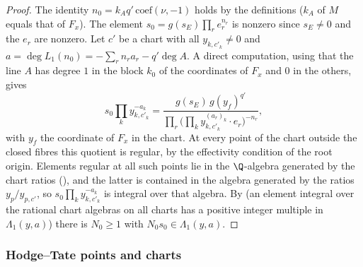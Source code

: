 \begin{proof}
The identity $n_0=k_Aq'\,\mathrm{coef}(\nu,-1)$ holds by the definitions ($k_A$ of $M$ equals that of $F_x$). The element
$s_0=g(s_E)\prod_re_r^{n_r}$ is nonzero since $s_E\ne0$ and the $e_r$ are nonzero. Let $c'$ be a chart with all
$y_{k,c'_k}\ne0$ and $a=\deg L_1(n_0)=-\sum_rn_ra_r-q'\deg A$. A direct computation, using that the line $A$ has degree $1$ in the
block $k_0$ of the coordinates of $F_x$ and $0$ in the others, gives
\[
s_0\prod_ky_{k,c'_k}^{-a_k}=\frac{g(s_E)\,g(y_f)^{q'}}{\prod_r\bigl(\prod_ky_{k,c'_k}^{(a_r)_k}\cdot e_r\bigr)^{-n_r}},
\]
with $y_f$ the coordinate of $F_x$ in the chart. At every point of the chart outside the closed fibres this
quotient is regular, by the effectivity condition of the root origin. Elements regular at all such points
lie in the $\Q$-algebra generated by the chart ratios
(), and the latter is contained
in the algebra generated by the ratios $y_p/y_{p,c'}$, so $s_0\prod_ky_{k,c'_k}^{-a_k}$ is integral over that algebra.
By  (an element integral over the rational chart
algebras on all charts has a positive integer multiple in $\Lambda_1(y,a)$) there is $N_0\ge1$ with $N_0s_0\in\Lambda_1(y,a)$.
\end{proof}

\subsubsection*{Hodge--Tate points and charts}

